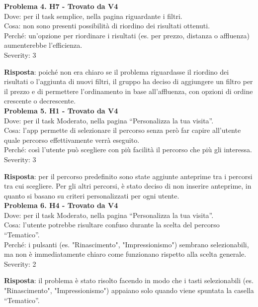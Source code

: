 \documentclass{article}
\begin{document}
\noindent \textbf{Problema 4. H7 - Trovato da V4} \\
Dove: per il task semplice, nella pagina riguardante i filtri. \\
Cosa: non sono presenti possibilità di riordino dei risultati ottenuti. \\
Perché: un’opzione per riordinare i risultati (es. per prezzo, distanza o affluenza) aumenterebbe l’efficienza. \\
Severity: 3

\noindent \textbf{Risposta}: poiché non era chiaro se il problema riguardasse il riordino dei risultati o l’aggiunta di nuovi filtri, il gruppo ha deciso di aggiungere un filtro per il prezzo e di permettere l'ordinamento in base all’affluenza, con opzioni di ordine crescente o decrescente.\\

\noindent \textbf{Problema 5. H1 - Trovato da V4} \\
Dove: per il task Moderato, nella pagina “Personalizza la tua visita”. \\
Cosa: l'app permette di selezionare il percorso senza però far capire all’utente quale percorso effettivamente verrà eseguito. \\
Perché: così l’utente può scegliere con più facilità il percorso che più gli interessa. \\
Severity: 3

\noindent \textbf{Risposta}: per il percorso predefinito sono state aggiunte anteprime tra i percorsi tra cui scegliere. Per gli altri percorsi, è stato deciso di non inserire anteprime, in quanto si basano su criteri personalizzati per ogni utente.\\

\noindent \textbf{Problema 6. H4 - Trovato da V4} \\
Dove: per il task Moderato, nella pagina “Personalizza la tua visita”. \\
Cosa: l’utente potrebbe risultare confuso durante la scelta del percorso “Tematico”. \\
Perché: i pulsanti (es. "Rinascimento", "Impressionismo") sembrano selezionabili, ma non è immediatamente chiaro come funzionano rispetto alla scelta generale. \\
Severity: 2

\noindent \textbf{Risposta}: il problema è stato risolto facendo in modo che i tasti selezionabili (es. "Rinascimento", "Impressionismo") appaiano solo quando viene spuntata la casella “Tematico”.\\
\end{document}
